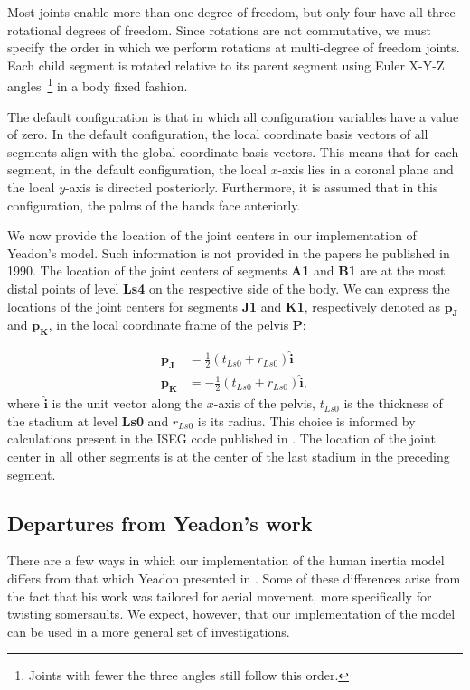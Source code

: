 \documentclass[10pt]{article}
\begin{document}
Most joints enable more than one degree of freedom, but only four have all
three rotational degrees of freedom. Since rotations are not commutative, we
must specify the order in which we perform rotations at multi-degree of freedom
joints. Each child segment is rotated relative to its parent segment using
Euler X-Y-Z angles~\footnote{Joints with fewer the three angles still follow
this order.} in a body fixed fashion.

The default configuration is that in which all configuration variables have a
value of zero. In the default configuration, the local coordinate basis vectors
of all segments align with the global coordinate basis vectors. This means that
for each segment, in the default configuration, the local $x$-axis lies in a
coronal plane and the local $y$-axis is directed posteriorly. Furthermore, it
is assumed that in this configuration, the palms of the hands face anteriorly.

We now provide the location of the joint centers in our implementation of
Yeadon's model. Such information is not provided in the papers he published
in 1990. The location of the joint centers of segments \textbf{A1} and
\textbf{B1} are at the most distal points of level \textbf{Ls4} on the
respective side of the body. We can express the locations of the joint centers
for segments \textbf{J1} and \textbf{K1}, respectively denoted as
$\mathbf{p_J}$ and $\mathbf{p_K}$, in the local coordinate frame of the pelvis
\textbf{P}:

\begin{align}
    \mathbf{p_J} &= \frac{1}{2} (t_{Ls0} + r_{Ls0})\mathbf{\hat{i}} \\
    \mathbf{p_K} &= -\frac{1}{2} (t_{Ls0} + r_{Ls0})\mathbf{\hat{i}},
\end{align}
where $\mathbf{\hat{i}}$ is the unit vector along the $x$-axis of the pelvis,
$t_{Ls0}$ is the thickness of the stadium at level \textbf{Ls0} and $r_{Ls0}$
is its radius. This choice is informed by calculations present in the ISEG code
published in \cite{Yeadon1984a}. The location of the joint center in all other
segments is at the center of the last stadium in the preceding segment.

\subsection*{Departures from Yeadon's work}

There are a few ways in which our implementation of the human inertia model
differs from that which Yeadon presented in \cite{Yeadon1990c, Yeadon1990f,
Yeadon1990e, Yeadon1990d}. Some of these differences arise from the fact that
his work was tailored for aerial movement, more specifically for twisting
somersaults. We expect, however, that our implementation of the model can be
used in a more general set of investigations.
\end{document}
